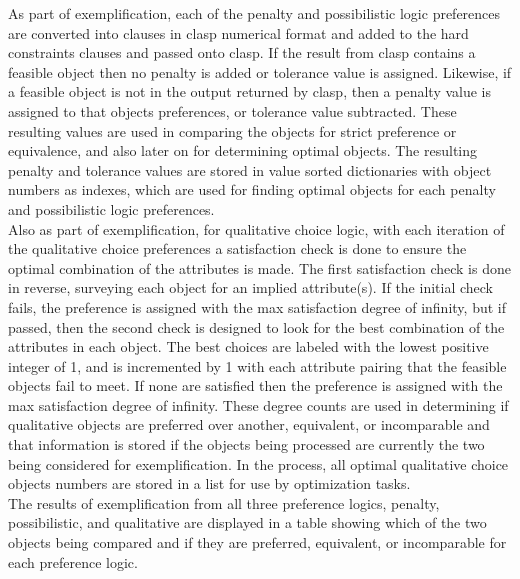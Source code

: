 \documentclass[12pt]{report}
\begin{document}
As part of exemplification, each of the penalty and possibilistic logic preferences are converted into clauses in clasp numerical format and added to the hard constraints clauses and passed onto clasp. If the result from clasp contains a feasible object then no penalty is added or tolerance value is assigned. Likewise, if a feasible object is not in the output returned by clasp, then a penalty value is assigned to that objects preferences, or tolerance value subtracted. These resulting values are used in comparing the objects for strict preference or equivalence, and also later on for determining optimal objects. The resulting penalty and tolerance values are stored in value sorted dictionaries with object numbers as indexes, which are used for finding optimal objects for each penalty and possibilistic logic preferences.\\

Also as part of exemplification, for qualitative choice logic, with each iteration of the qualitative choice preferences a satisfaction check is done to ensure the optimal combination of the attributes is made. The first satisfaction check is done in reverse, surveying each object for an implied attribute(s). If the initial check fails, the preference is assigned with the max satisfaction degree of infinity, but if passed, then the second check is designed to look for the best combination of the attributes in each object. The best choices are labeled with the lowest positive integer of 1, and is incremented by 1 with each attribute pairing that the feasible objects fail to meet. If none are satisfied then the preference is assigned with the max satisfaction degree of infinity. These degree counts are used in determining if qualitative objects are preferred over another, equivalent, or incomparable and that information is stored if the objects being processed are currently the two being considered for exemplification. In the process, all optimal qualitative choice objects numbers are stored in a list for use by optimization tasks.\\

The results of exemplification from all three preference logics, penalty, possibilistic, and qualitative are displayed in a table showing which of the two objects being compared and if they are preferred, equivalent, or incomparable for each preference logic.

\newpage
\end{document}
